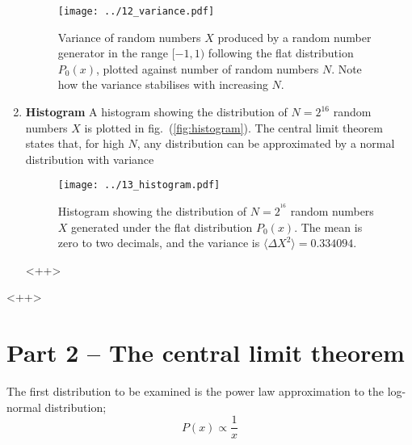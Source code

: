 \documentclass[a4paper,11pt]{article}
\begin{document}
\begin{enumerate}
        \begin{figure}[htb]
            \begin{center}
                \texttt{[image: ../12\_variance.pdf]}
            \end{center}
            \caption{Variance of random numbers $X$ produced by a random number generator in the range $[-1,1)$ following the flat distribution $P_0(x)$, plotted against number of random numbers $N$. Note how the variance stabilises with increasing $N$. }
            \label{fig:12_variance}
        \end{figure}

    \item \textbf{Histogram} A histogram showing the distribution of $N=2^{16}$ random numbers $X$ is plotted in fig.~(\ref{fig:histogram}). The central limit theorem states that, for high $N$, any distribution can be approximated by a normal distribution with variance 

        \begin{figure}[htb]
            \begin{center}
                \texttt{[image: ../13\_histogram.pdf]}
            \end{center}
            \caption{Histogram showing the distribution of $N=2^{^16}$ random numbers $X$ generated under the flat distribution $P_0(x)$. The mean is zero to two decimals, and the variance is $\langle \Delta X^2 \rangle = 0.334094$.  }
            \label{fig:13_histogram}
        \end{figure}<++>
\end{enumerate}<++>

\section{Part 2 -- The central limit theorem}
The first distribution to be examined is the power law approximation to the log-normal distribution;
\begin{equation}
    P(x) \propto \frac{1}{x}
    \label{eq:powerlawdist}
\end{equation}
\end{document}
